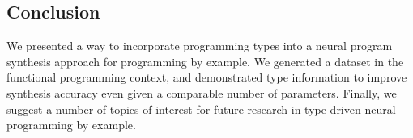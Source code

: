 \documentclass{article} %
\begin{document}

\vspace{-10pt}
\subsection{Conclusion}
\vspace{-10pt}

We presented a way to incorporate programming types into a neural program synthesis approach for programming by example.
We generated a dataset in the functional programming context,
and demonstrated type information to improve synthesis accuracy even given a comparable number of parameters.
Finally, we suggest a number of topics of interest for future research in type-driven neural programming by example.


% 
% 






\end{document}
